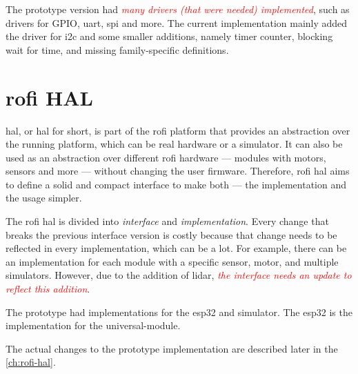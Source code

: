 \documentclass[
  digital,     %
  oneside,     %
  nosansbold,  %
  nocolorbold, %
  nolof,         %
  nolot,         %
]{fithesis4}
\newcommand{\TODO}[1]{\textcolor{red}{\textit{#1}}}
\newcommand{\TODOLIST}[1]{}
\begin{document}
{{{The prototype version had \TODO{many drivers (that were needed) implemented}, such as drivers for GPIO, \acrshort{uart}, \acrshort{spi} and more. The current implementation mainly added the driver for \acrshort{i2c} and some smaller additions, namely timer counter, blocking wait for time, and missing family-specific definitions.

\section[ RoFI HAL ]{ \acrshort{rofi} HAL } \label{sec:rofi-hal-desc}
\TODOLIST{
\begin{itemize}
    \item ROFI HAL interface --- prototype vs changes
    \item ROFI HAL implementation esp32    
\end{itemize}
}

\acrlong{hal}, or \acrshort{hal} for short, is part of the \acrshort{rofi} platform that provides an abstraction over the running platform, which can be real hardware or a simulator. It can also be used as an abstraction over different \acrshort{rofi} hardware --- modules with motors, sensors and more --- without changing the user firmware. Therefore, \acrshort{rofi} \acrshort{hal} aims to define a solid and compact interface to make both --- the implementation and the usage simpler.

The \acrshort{rofi} \acrshort{hal} is divided into \emph{interface} and \emph{implementation}. Every change that breaks the previous interface version is costly because that change needs to be reflected in every implementation, which can be a lot. For example, there can be an implementation for each module with a specific sensor, motor, and multiple simulators. However, due to the addition of \acrshort{lidar}, \TODO{the interface needs an update to reflect this addition}.

The prototype had implementations for the esp32 and simulator. The esp32 is the implementation for the \gls{universal-module}.

The actual changes to the prototype implementation are described later in the \autoref{ch:rofi-hal}.

}}}
\end{document}
